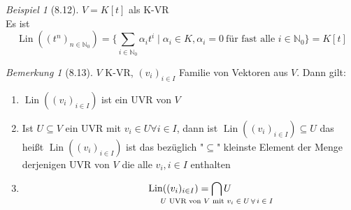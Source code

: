 \documentclass[a4paper]{scrartcl}
\DeclareMathOperator{\Forall}{\forall}
\DeclareMathOperator{\Lin}{Lin}
\theoremstyle{definition}
\theoremstyle{plain}
\theoremstyle{plain}
\theoremstyle{remark}
\newtheorem{remark}{Bemerkung}
\theoremstyle{remark}
\theoremstyle{remark}
\theoremstyle{remark}
\theoremstyle{remark}
\newtheorem{ex}{Beispiel}
\begin{document}
\begin{ex}[8.12]
$V = K[t]$ als K-VR \\
  Es ist \[\Lin((t^n)_{n\in\mathbb{N}_0}) = \{\sum_{i\in\mathbb{N}_0} \alpha_i t^i \mid \alpha_i \in K, \alpha_i = 0~\text{für fast alle $i\in \mathbb{N}_0$}\} = K[t]\]
\end{ex}
\begin{remark}[8.13]
$V$ K-VR, $(v_i)_{i\in I}$ Familie von Vektoren aus $V$. Dann gilt:
\begin{enumerate}
\item $\Lin((v_i)_{i\in I})$ ist ein UVR von $V$
\item Ist $U\subseteq V$ ein UVR mit $v_i \in U\Forall i\in I$, dann ist $\Lin((v_i)_{i\in I}) \subseteq U$
         das heißt $\Lin((v_i)_{i\in I})$ ist das bezüglich "$\subseteq$" kleinste Element der Menge derjenigen UVR von $V$ die alle $v_i, i\in I$ enthalten
\item \[\Lin((v_i)_{i\in I}) = \bigcap_{\mathclap{\text{$U$ UVR von $V$ mit $v_i \in U \Forall i\in I$}}} U\]
\end{enumerate}
\end{remark}
\end{document}
